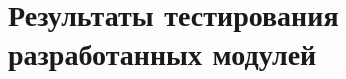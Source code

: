 \begin{code}
\caption{Модуль кубического корня.}
\label{lst:cbrt}
\begin{verbatim}
\end{verbatim}
\end{code}

\begin{code}
\caption{Модуль результата функции.}
\label{lst:func_result}
\begin{verbatim}
\end{verbatim}
\end{code}

\section{Результаты тестирования разработанных модулей}
\label{app:testing}

\begin{code}
\caption{Вывод разработанного тестового модуля.}
\label{lst:test_output}
\begin{verbatim}
\end{verbatim}
\end{code}